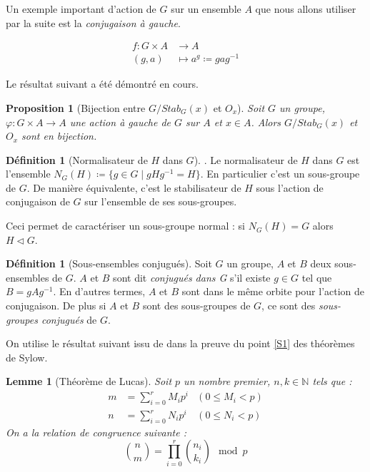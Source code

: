 \documentclass{article}
\theoremstyle{definition}
\newtheorem{definition}[subsubsection]{Définition}
\theoremstyle{plain}
\newtheorem{proposition}[subsubsection]{Proposition}
\theoremstyle{plain}
\theoremstyle{plain}
\newtheorem{lemma}[subsubsection]{Lemme}
\theoremstyle{plain}
\theoremstyle{definition}
\theoremstyle{plain}
\theoremstyle{plain}
\begin{document}
Un exemple important d'action de \( G \) sur un ensemble \( A \) que nous allons utiliser par la suite est la \textit{conjugaison à gauche}.


\begin{align*}
	f : G \times A &\to A \\
	(g,a) &\mapsto a^{g} \coloneq gag^{-1}
\end{align*}

Le résultat suivant a été démontré en cours.  
\begin{proposition}[Bijection entre \ensuremath{G/Stab_G(x)} et \ensuremath{O_x}]\label{prop:bij}
	Soit \( G \) un groupe, \( \varphi : G \times A \rightarrow A \) une action à gauche de \( G \) sur \( A \) et \( x \in A \). Alors \( G/Stab_G(x) \) et \( O_x \) sont en bijection.
\end{proposition}

\begin{definition}[Normalisateur de \ensuremath{H} dans \ensuremath{G}]\cite[p.~217]{chen2024napkin}.
	Le normalisateur de \( H \) dans \( G \) est l'ensemble 
	\( N_{G}({H}) \coloneq \{ g \in G \mid gHg^{-1} = H \} \).
	En particulier c'est un sous-groupe de \( G \). De manière équivalente, c'est le stabilisateur de \( H \) sous l'action de conjugaison de \( G \) sur l'ensemble de ses sous-groupes. 
\end{definition}

Ceci permet de caractériser un sous-groupe normal : si \( N_G(H) = G \) alors \( H \triangleleft G \).

\begin{definition}[Sous-ensembles conjugués]\cite[p. ~123]{dummit2003abstract} 
	Soit \( G \) un groupe, \( A \) et \( B \) deux sous-ensembles de \( G \). 
	\( A \) et \( B \) sont dit 
	\textit{conjugués dans G} s'il existe \( g \in G \) tel que \( B = gAg^{-1} \).
	En d'autres termes, \( A \) et \( B \) sont dans le même orbite pour l'action de conjugaison. De plus si \( A \) et \( B \) sont des sous-groupes de \( G \), ce sont des \textit{sous-groupes conjugués} de \( G \).
\end{definition}

On utilise le résultat suivant issu de \cite{fine1947binomial} dans la preuve du point \ref{S1} des théorèmes de Sylow.

\begin{lemma}[Théorème de Lucas]\label{thm:lucas}
	Soit \( p \) un nombre premier, \( n,k \in \mathbb{N} \) tels que :
	\begin{align*}
		m &= \sum_{i=0}^{r} M_{i}p^{i} &(0 \leq M_i < p)\\
		n &= \sum_{i=0}^{r} N_{i}p^{i} &(0 \leq N_i < p)
	\end{align*}
	On a la relation de congruence suivante :
	\begin{equation*}
		\binom{n}{m} = \prod_{i=0}^{r} \binom{n_i}{k_i} \mod p 
	\end{equation*}
\end{lemma}
\end{document}
